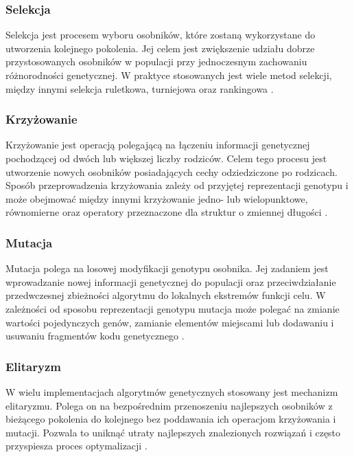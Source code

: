 \subsubsection*{Selekcja}
Selekcja jest procesem wyboru osobników,
które zostaną wykorzystane
do utworzenia kolejnego pokolenia.
Jej celem jest zwiększenie udziału
dobrze przystosowanych osobników
w populacji przy jednoczesnym
zachowaniu różnorodności genetycznej.
W praktyce stosowanych jest wiele metod selekcji,
między innymi selekcja ruletkowa,
turniejowa oraz rankingowa%
.

\subsubsection*{Krzyżowanie}
Krzyżowanie jest operacją polegającą
na łączeniu informacji genetycznej pochodzącej
od dwóch lub większej liczby rodziców.
Celem tego procesu jest utworzenie nowych osobników
posiadających cechy odziedziczone po rodzicach.
Sposób przeprowadzenia krzyżowania zależy
od przyjętej reprezentacji genotypu
i może obejmować między innymi krzyżowanie
jedno- lub wielopunktowe, równomierne oraz operatory
przeznaczone dla struktur o zmiennej długości%
%
%
.

\subsubsection*{Mutacja}
Mutacja polega na losowej modyfikacji genotypu osobnika.
Jej zadaniem jest wprowadzanie nowej
informacji genetycznej do populacji
oraz przeciwdziałanie przedwczesnej zbieżności algorytmu
do lokalnych ekstremów funkcji celu.
W zależności od sposobu reprezentacji genotypu mutacja
może polegać na zmianie wartości pojedynczych genów,
zamianie elementów miejscami
lub dodawaniu i usuwaniu fragmentów kodu genetycznego%
.

\subsubsection*{Elitaryzm}
W wielu implementacjach algorytmów genetycznych
stosowany jest mechanizm elitaryzmu.
Polega on na bezpośrednim przenoszeniu najlepszych
osobników z bieżącego pokolenia do kolejnego
bez poddawania ich operacjom krzyżowania i mutacji.
Pozwala to uniknąć utraty najlepszych znalezionych
rozwiązań i często przyspiesza proces optymalizacji%
.

